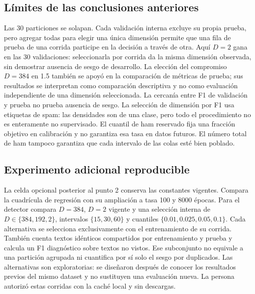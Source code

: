 \documentclass[11pt,letterpaper]{article}
\renewcommand{\_}{\originalunderscore\allowbreak}
\begin{document}
\subsection{Límites de las conclusiones anteriores}
Las 30 particiones se solapan. Cada validación interna excluye su propia
prueba, pero agregar todas para elegir una única dimensión permite que una
fila de prueba de una corrida participe en la decisión a través de otra.
Aquí $D=2$ gana en las 30 validaciones: seleccionarla por corrida da la misma
dimensión observada, sin demostrar ausencia de sesgo de desarrollo.
La elección del compromiso $D=384$ en 1.5 también se apoyó en la comparación
de métricas de prueba; sus resultados se interpretan como comparación
descriptiva y no como evaluación independiente de una dimensión seleccionada.
La cercanía entre F1 de validación y prueba no prueba ausencia de sesgo.
La selección de dimensión por F1 usa etiquetas de spam: las densidades son
de una clase, pero todo el procedimiento no es enteramente no supervisado.
El cuantil de ham reservado fija una fracción objetivo en calibración y no
garantiza esa tasa en datos futuros. El número total de ham tampoco
garantiza que cada intervalo de las colas esté bien poblado.

\subsection{Experimento adicional reproducible}
La celda opcional posterior al punto 2 conserva las constantes vigentes.
Compara la cuadrícula de regresión con su ampliación a tasa 100 y 8000
épocas. Para el detector compara $D=384$, $D=2$ vigente y una selección
interna de $D\in\{384,192,2\}$, intervalos $\{15,30,60\}$ y cuantiles
$\{0.01,0.025,0.05,0.1\}$. Cada alternativa se selecciona exclusivamente
con el entrenamiento de su corrida. También cuenta textos idénticos
compartidos por entrenamiento y prueba y calcula un F1 diagnóstico sobre
textos no vistos. Ese subconjunto no equivale a una partición agrupada ni
cuantifica por sí solo el sesgo por duplicados.
Las alternativas son exploratorias: se diseñaron después de conocer los
resultados previos del mismo dataset y no sustituyen una evaluación nueva.
La persona autorizó estas corridas con la caché local y sin descargas.
\end{document}

